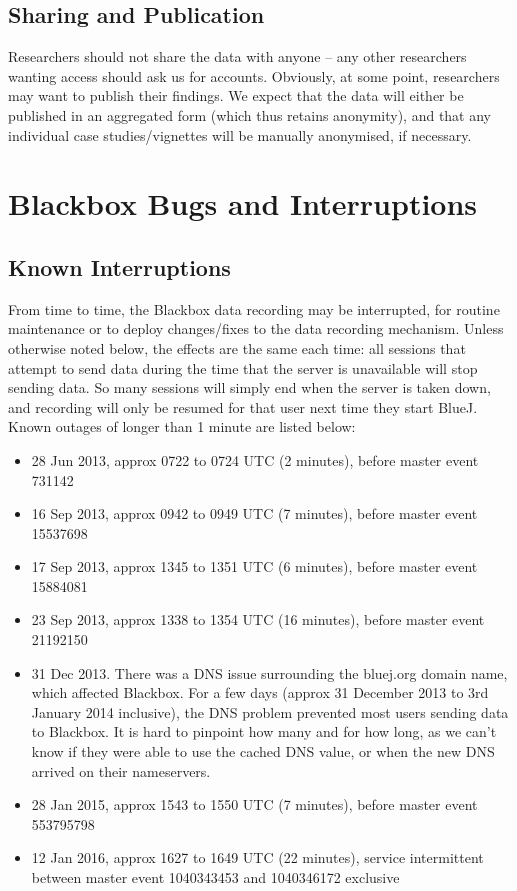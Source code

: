 \documentclass{report}
\begin{document}
\section{Sharing and Publication}

Researchers should not share the data with anyone -- any other researchers
wanting access should ask us for accounts.  Obviously, at some point,
researchers may want to publish their findings.  We expect that the data will
either be published in an aggregated form (which thus retains anonymity), and
that any individual case studies/vignettes will be manually anonymised, if
necessary.

\chapter{Blackbox Bugs and Interruptions}

\section{Known Interruptions}

From time to time, the Blackbox data recording may be interrupted, for routine maintenance or to deploy changes/fixes to the data recording mechanism.
Unless otherwise noted below, the effects are the same each time: all sessions that attempt to send data during the time that the server is unavailable will stop sending data.  So many sessions will simply end when the server is taken down, and recording will only be resumed for that user next time they start BlueJ.  Known outages of longer than 1 minute are listed below:

\begin{itemize}
\item 28 Jun 2013, approx 0722 to 0724 UTC (2 minutes), before master event 731142
\item 16 Sep 2013, approx 0942 to 0949 UTC (7 minutes), before master event 15537698
\item 17 Sep 2013, approx 1345 to 1351 UTC (6 minutes), before master event 15884081
\item 23 Sep 2013, approx 1338 to 1354 UTC (16 minutes), before master event 21192150
\item 31 Dec 2013.  There was a DNS issue surrounding the bluej.org domain name, which affected Blackbox.  For a few days (approx 31 December 2013 to 3rd January 2014 inclusive), the DNS problem prevented most users sending data to Blackbox.  It is hard to pinpoint how many and for how long, as we can't know if they were able to use the cached DNS value, or when the new DNS arrived on their nameservers.
\item 28 Jan 2015, approx 1543 to 1550 UTC (7 minutes), before master event 553795798
\item 12 Jan 2016, approx 1627 to 1649 UTC (22 minutes), service intermittent between master event 1040343453 and 1040346172 exclusive
\end{itemize}
\end{document}
